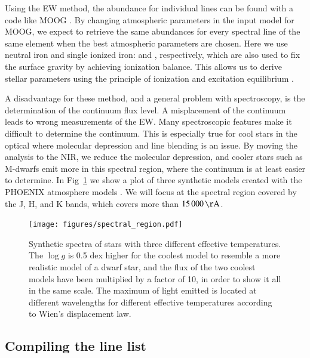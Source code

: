 \documentclass{aa}
\begin{document}
Using the EW method, the abundance for individual lines can be found
with a code like MOOG \citep{Sneden1973}. By changing atmospheric
parameters in the input model for MOOG, we expect to retrieve the same
abundances for every spectral line of the same element when
the best atmospheric parameters are chosen. Here we use neutral iron and
single ionized iron:  and , respectively, which are also used to
fix the surface gravity by achieving ionization balance. This allows
us to derive stellar parameters using the principle of ionization and
excitation equilibrium \citep{Gray2006}.

A disadvantage for these method, and a general problem with spectroscopy,
is the determination of the continuum flux level. A misplacement of the
continuum leads to wrong measurements of the EW. Many spectroscopic
features make it difficult to determine the continuum. This is
especially true for cool stars in the optical where molecular depression
and line blending is an issue. By moving the analysis to the NIR, we
reduce the molecular depression, and cooler stars such as M-dwarfs
emit more in this spectral region, where the continuum is at least
easier to determine. In Fig~\ref{fig:spectral_region} we show a plot
of three synthetic models created with the PHOENIX atmosphere models
\citep{Husser2013}. We will focus at the spectral region covered by the
J, H, and K bands, which covers more than $\SI{15000}{\AA}$.

\begin{figure}[tbp!]
    \centering
    \texttt{[image: figures/spectral\_region.pdf]}
    \caption{Synthetic spectra of stars with three different effective
    temperatures. The $\log g$ is 0.5 dex higher for the coolest model
    to resemble a more realistic model of a dwarf star,
    and the flux of the two coolest models have been multiplied by a
    factor of 10, in order to show it all in the same scale. The maximum
    of light emitted is located at different wavelengths for different
    effective temperatures according to Wien's displacement law.}
    \label{fig:spectral_region}
\end{figure}




\subsection{Compiling the line list}
\end{document}
